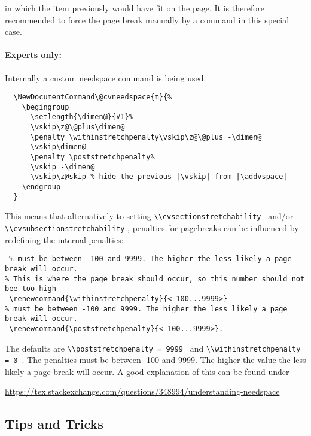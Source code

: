 \documentclass[a4paper,11pt]{article}
\newcommand{\code}[1]{\lstinline!#1!}
\newcommand{\Code}[1]{\lstinline!#1!~} %
\begin{document}
in which the item previously would have fit on the page. 
It is therefore recommended to force the page break manually by a \newpage command in this special case.

\paragraph{Experts only:}
Internally a custom needspace command is being used: 

\begin{lstlisting}
  \NewDocumentCommand\@cvneedspace{m}{%
    \begingroup
      \setlength{\dimen@}{#1}%
      \vskip\z@\@plus\dimen@
      \penalty \withinstretchpenalty\vskip\z@\@plus -\dimen@
      \vskip\dimen@
      \penalty \poststretchpenalty%
      \vskip -\dimen@
      \vskip\z@skip % hide the previous |\vskip| from |\addvspace|
    \endgroup
  }
\end{lstlisting}
This means that alternatively to setting \Code{\\cvsectionstretchability} and/or \code{\\cvsubsectionstretchability} , penalties for pagebreaks can be influenced by redefining the internal penalties:
\begin{lstlisting}
 % must be between -100 and 9999. The higher the less likely a page break will occur.
% This is where the page break should occur, so this number should not bee too high
 \renewcommand{\withinstretchpenalty}{<-100...9999>}
% must be between -100 and 9999. The higher the less likely a page break will occur.
 \renewcommand{\poststretchpenalty}{<-100...9999>}.
\end{lstlisting}
The defaults are \Code{\\poststretchpenalty = 9999} and \Code{\\withinstretchpenalty = 0}. 
The penalties must be between -100 and 9999. The higher the value the less likely a page break will occur. A good explanation of this can be found under 
\begin{center}
  \url{https://tex.stackexchange.com/questions/348994/understanding-needspace}
\end{center}



\subsection{Tips and Tricks}
\end{document}
